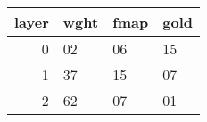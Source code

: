 \begin{tabular}{rlll}
\toprule
 layer & wght & fmap & gold \\
\midrule
     0 &   02 &   06 &   15 \\
     1 &   37 &   15 &   07 \\
     2 &   62 &   07 &   01 \\
\bottomrule
\end{tabular}
